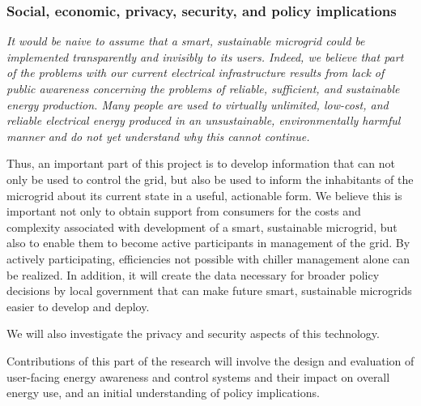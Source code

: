 
\subsubsection{Social, economic, privacy, security, and policy implications}

{\em It would be naive to assume that a smart, sustainable microgrid could
  be implemented transparently and invisibly to its users.  Indeed, we
  believe that part of the problems with our current electrical
  infrastructure results from lack of public awareness concerning the
  problems of reliable, sufficient, and sustainable energy production.
  Many people are used to virtually unlimited, low-cost, and reliable
  electrical energy produced in an unsustainable, environmentally harmful
  manner and do not yet understand why this cannot continue.

  Thus, an important part of this project is to develop information that
  can not only be used to control the grid, but also be used to inform the
  inhabitants of the microgrid about its current state in a useful,
  actionable form.  We believe this is important not only to obtain support
  from consumers for the costs and complexity associated with development
  of a smart, sustainable microgrid, but also to enable them to become
  active participants in management of the grid.  By actively
  participating, efficiencies not possible with chiller management alone
  can be realized.  In addition, it will create the data necessary for
  broader policy decisions by local government that can make future smart,
  sustainable microgrids easier to develop and deploy.
  
  We will also investigate the privacy and security aspects of this technology.

  Contributions of this part of the research will involve the design and evaluation of
  user-facing energy awareness and control systems and their impact on
  overall energy use, and an initial understanding of policy
  implications. }
